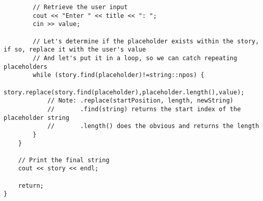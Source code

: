 \documentclass{article}
\begin{document}
\begin{lstlisting}
        // Retrieve the user input
        cout << "Enter " << title << ": ";
        cin >> value;
        
        // Let's determine if the placeholder exists within the story, if so, replace it with the user's value
        // And let's put it in a loop, so we can catch repeating placeholders
        while (story.find(placeholder)!=string::npos) {
            story.replace(story.find(placeholder),placeholder.length(),value);
            // Note: .replace(startPosition, length, newString)
            //       .find(string) returns the start index of the placeholder string
            //       .length() does the obvious and returns the length
        }
    }
    
    // Print the final string
    cout << story << endl;
    
    return;
}
\end{lstlisting}

\hline
\end{document}
